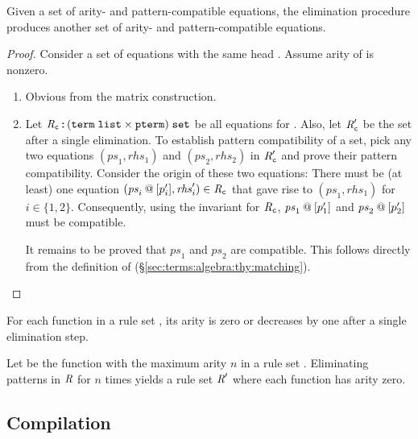 \begin{lemma}[Invariant]
  Given a set of arity- and pattern-compatible equations, the elimination procedure produces another set of arity- and pattern-compatible equations.
\end{lemma}

\begin{proof}
  Consider a set of equations with the same head .
  Assume arity of  is nonzero.
  \begin{enumerate}
    \item
      Obvious from the matrix construction.
    \item
      Let $\textit{R}_{\texttt{\textup{c}}} \mathbin{:\!\!:} (\texttt{\textup{term}}\;\texttt{\textup{list}} \times \texttt{\textup{pterm}})\;\texttt{\textup{set}}$ be all equations for .
      Also, let $\textit{R}_{\texttt{\textup{c}}}'$ be the set after a single elimination.
      To establish pattern compatibility of a set, pick any two equations $(\mathit{ps}_1, \mathit{rhs}_1)$ and $(\mathit{ps}_2, \mathit{rhs}_2)$ in $\textit{R}_{\texttt{\textup{c}}}'$ and prove their pattern compatibility.
      Consider the origin of these two equations:
      There must be (at least) one equation $(\mathit{ps}_i \mathbin{\mathtt{@}} [p_i'], \mathit{rhs}_i') \in \textit{R}_{\texttt{\textup{c}}}$ that gave rise to $(\mathit{ps}_1, \mathit{rhs}_1)$ for $i \in \{1, 2\}$.
      Consequently, using the invariant for $\textit{R}_{\texttt{\textup{c}}}$, $\mathit{ps}_1 \mathbin{\mathtt{@}} [p_1']$ and $\mathit{ps}_2 \mathbin{\mathtt{@}} [p_2']$ must be compatible.

      It remains to be proved that $\mathit{ps}_1$ and $\mathit{ps}_2$ are compatible.
      This follows directly from the definition of  (§\ref{sec:terms:algebra:thy:matching}).
      \qedhere
  \end{enumerate}
\end{proof}

\begin{lemma}[Termination]
  For each function in a rule set \R, its arity is zero or decreases by one after a single elimination step.
\end{lemma}

\begin{corollary}\label{thm:intermediate:elim:iter}
  Let  be the function with the maximum arity $n$ in a rule set \R.
  Eliminating patterns in $\textit{R}$ for $n$ times yields a rule set $\textit{R}'$ where each function has arity zero.
\end{corollary}

\subsection{Compilation}
\label{sec:intermediate:elim:impl}

